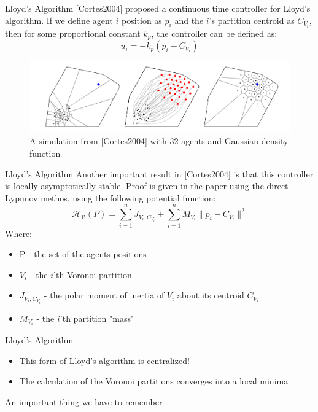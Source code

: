 \documentclass[t]{beamer}
\newcommand{\norm}[1]{\lVert #1 \rVert}
\begin{document}
\begin{frame}[label=lloydsalg6]{Lloyd's Algorithm}
[Cortes2004] proposed a continuous time controller for Lloyd's algorithm. If we define agent $i$ position as $p_i$ and the $i$'s partition centroid as $C_{V_{i}}$, then for some proportional constant $k_{p}$, the controller can be defined as:
\begin{equation*} \label{Lloyds contoller}
u_{i} = -k_{p}\left( p_i - C_{V_{i}} \right)
\end{equation*}

\begin{figure}[b]
\centering
\includegraphics[scale=0.3]{background/Lloyds-alg-from-cortes.png}
\caption{A simulation from [Cortes2004] with 32 agents and Gaussian density function}
\end{figure}
\end{frame}
\begin{frame}[label=lloydsalg7]{Lloyd's Algorithm}
Another important result in [Cortes2004] is that this controller is locally asymptotically stable. Proof is given in the paper using the direct Lypunov methos, using the following potential function:
\begin{equation*}
\mathcal{H_{V}}\left( P \right) = \sum_{i=1}^{n} J_{V_i,C_{V_i}} + \sum_{i=1}^{n} M_{V_i} \norm{p_i - C_{V_i}}^2
\end{equation*}
Where:
\begin{itemize}
\item P - the set of the agents positions
\item $V_i$ - the $i$'th Voronoi partition
\item $J_{V_i,C_{V_i}}$ - the polar moment of inertia of $V_i$ about its centroid $C_{V_i}$
\item $M_{V_i}$ - the $i$'th partition "mass"
\end{itemize}
\end{frame}
\begin{frame}[label=lloydsalg8]{Lloyd's Algorithm}
\begin{itemize}
\item This form of Lloyd's algorithm is centralized!
\item The calculation of the Voronoi partitions converges into a local minima
\end{itemize}
An important thing we have to remember - \\

\end{frame}
\end{document}
